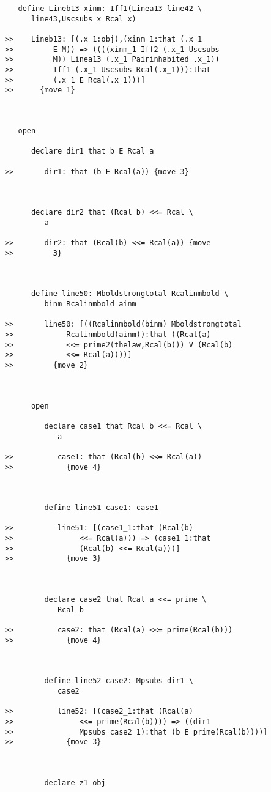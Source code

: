 \documentclass[12pt]{article}
\begin{document}
\begin{verbatim}
   define Lineb13 xinm: Iff1(Linea13 line42 \
      line43,Uscsubs x Rcal x)

>>    Lineb13: [(.x_1:obj),(xinm_1:that (.x_1
>>         E M)) => ((((xinm_1 Iff2 (.x_1 Uscsubs
>>         M)) Linea13 (.x_1 Pairinhabited .x_1))
>>         Iff1 (.x_1 Uscsubs Rcal(.x_1))):that
>>         (.x_1 E Rcal(.x_1)))]
>>      {move 1}



   open

      declare dir1 that b E Rcal a

>>       dir1: that (b E Rcal(a)) {move 3}



      declare dir2 that (Rcal b) <<= Rcal \
         a

>>       dir2: that (Rcal(b) <<= Rcal(a)) {move
>>         3}



      define line50: Mboldstrongtotal Rcalinmbold \
         binm Rcalinmbold ainm

>>       line50: [((Rcalinmbold(binm) Mboldstrongtotal
>>            Rcalinmbold(ainm)):that ((Rcal(a)
>>            <<= prime2(thelaw,Rcal(b))) V (Rcal(b)
>>            <<= Rcal(a))))]
>>         {move 2}



      open

         declare case1 that Rcal b <<= Rcal \
            a

>>          case1: that (Rcal(b) <<= Rcal(a))
>>            {move 4}



         define line51 case1: case1

>>          line51: [(case1_1:that (Rcal(b)
>>               <<= Rcal(a))) => (case1_1:that
>>               (Rcal(b) <<= Rcal(a)))]
>>            {move 3}



         declare case2 that Rcal a <<= prime \
            Rcal b

>>          case2: that (Rcal(a) <<= prime(Rcal(b)))
>>            {move 4}



         define line52 case2: Mpsubs dir1 \
            case2

>>          line52: [(case2_1:that (Rcal(a)
>>               <<= prime(Rcal(b)))) => ((dir1
>>               Mpsubs case2_1):that (b E prime(Rcal(b))))]
>>            {move 3}



         declare z1 obj


\end{verbatim}
\end{document}
